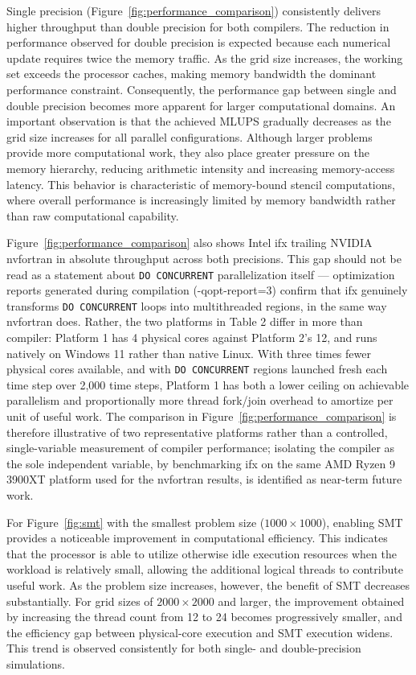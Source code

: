 \documentclass[11pt,a4paper]{article}
\begin{document}
Single precision (Figure~\ref{fig:performance_comparison})  consistently delivers higher throughput than double precision for both compilers. The reduction in performance observed for double precision is expected because each numerical update requires twice the memory traffic. As the grid size increases, the working set exceeds the processor caches, making memory bandwidth the dominant performance constraint. Consequently, the performance gap between single and double precision becomes more apparent for larger computational domains. An important observation is that the achieved MLUPS gradually decreases as the grid size increases for all parallel configurations. Although larger problems provide more computational work, they also place greater pressure on the memory hierarchy, reducing arithmetic intensity and increasing memory-access latency. This behavior is characteristic of memory-bound stencil computations, where overall performance is increasingly limited by memory bandwidth rather than raw computational capability.
	
Figure~\ref{fig:performance_comparison} also shows Intel ifx trailing NVIDIA nvfortran in absolute throughput across both precisions. This gap should not be read as a statement about \texttt{DO CONCURRENT} parallelization itself — optimization reports generated during compilation (-qopt-report=3) confirm that ifx genuinely transforms \texttt{DO CONCURRENT} loops into multithreaded regions, in the same way nvfortran does. Rather, the two platforms in Table 2 differ in more than compiler: Platform 1 has 4 physical cores against Platform 2's 12, and runs natively on Windows 11 rather than native Linux. With three times fewer physical cores available, and with \texttt{DO CONCURRENT} regions launched fresh each time step over 2,000 time steps, Platform 1 has both a lower ceiling on achievable parallelism and proportionally more thread fork/join overhead to amortize per unit of useful work. The comparison in Figure~\ref{fig:performance_comparison} is therefore illustrative of two representative platforms rather than a controlled, single-variable measurement of compiler performance; isolating the compiler as the sole independent variable, by benchmarking ifx on the same AMD Ryzen 9 3900XT platform used for the nvfortran results, is identified as near-term future work.	
	
	
 For Figure~\ref{fig:smt} with the smallest problem size ($1000 \times 1000$), enabling SMT provides a noticeable improvement in computational efficiency. This indicates that the processor is able to utilize otherwise idle execution resources when the workload is relatively small, allowing the additional logical threads to contribute useful work. As the problem size increases, however, the benefit of SMT decreases substantially. For grid sizes of $2000 \times 2000$ and larger, the improvement obtained by increasing the thread count from 12 to 24 becomes progressively smaller, and the efficiency gap between physical-core execution and SMT execution widens. This trend is observed consistently for both single- and double-precision simulations.
\end{document}
